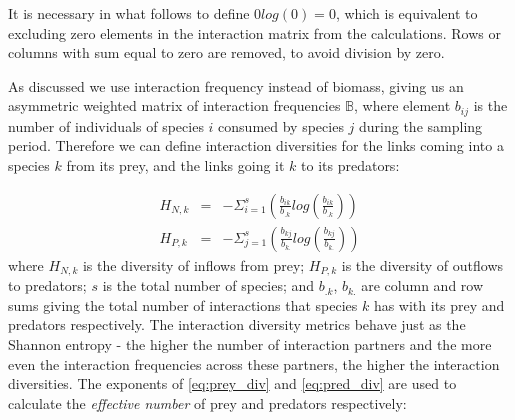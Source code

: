 It is necessary in what follows to define $0log(0)=0$, which is equivalent to excluding zero elements in the interaction matrix from the calculations. Rows or columns with sum equal to zero are removed, to avoid division by zero.    
 
As discussed we use interaction frequency instead of biomass, giving us an asymmetric weighted matrix of interaction frequencies $\mathbb{B}$, where element $b_{ij}$ is the number of individuals of species $i$ consumed by species $j$ during the sampling period. Therefore we can define interaction diversities for the links coming into a species $k$ from its prey, and the links going it $k$ to its predators:  

\begin{eqnarray}
H_{N,k} &=& -\Sigma_{i=1}^{s} \left( \frac{b_{ik}}{b_{.k}} log \left( \frac{b_{ik}}{b_{.k}} \right) \right) \label{eq:prey_div} \\
H_{P,k} &=& -\Sigma_{j=1}^{s} \left( \frac{b_{kj}}{b_{k.}} log \left( \frac{b_{kj}}{b_{k.}} \right) \right) \label{eq:pred_div}
\end{eqnarray}
%
where $H_{N,k}$ is the diversity of inflows from prey; $H_{P,k}$ is the diversity of outflows to predators; $s$ is the total number of species; and $b_{.k}$, $b_{k.}$ are column and row sums giving the total number of interactions that species $k$ has with its prey and predators respectively. The interaction diversity metrics behave just as the Shannon entropy - the higher the number of interaction partners and the more even the interaction frequencies across these partners, the higher the interaction diversities. The exponents of \eqref{eq:prey_div} and \eqref{eq:pred_div} are used to calculate the \emph{effective number} of prey and predators respectively:

